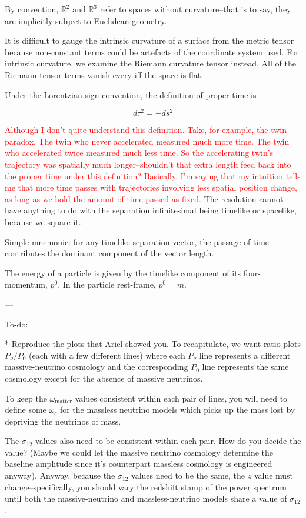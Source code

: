\documentclass[11pt]{article}
\begin{document}
By convention, $\mathbb{R}^2$ and $\mathbb{R}^3$ refer to spaces without curvature--that is to say, they are implicitly subject to Euclidean geometry.

It is difficult to gauge the intrinsic curvature of a surface from the metric tensor because non-constant terms could be artefacts of the coordinate system used. For intrinsic curvature, we examine the Riemann curvature tensor instead. All of the Riemann tensor terms vanish every iff the space is flat.

Under the Lorentzian sign convention, the definition of proper time is

\begin{equation}
	d\tau^2 = -ds^2
\end{equation}

\textcolor{red}{Although I don't quite understand this definition. Take, for example, the twin paradox. The twin who never accelerated measured much more time. The twin who accelerated twice measured much less time. So the accelerating twin's trajectory was spatially much longer--shouldn't that extra length feed back into the proper time under this definition? Basically, I'm saying that my intuition tells me that more time passes with trajectories involving less spatial position change, as long as we hold the amount of time passed as fixed.} The resolution cannot have anything to do with the separation infinitesimal being timelike or spacelike, because we square it.

Simple mnemonic: for any timelike separation vector, the passage of time contributes the dominant component of the vector length.

The energy of a particle is given by the timelike component of its four-momentum, $p^0$. In the particle rest-frame, $p^0 = m$.

---

To-do:

* Reproduce the plots that Ariel showed you. To recapitulate, we want ratio plots $P_\nu / P_0$ (each with a few different lines) where each $P_\nu$ line represents a different massive-neutrino cosmology and the corresponding $P_0$ line represents the same cosmology except for the absence of massive neutrinos.

To keep the $\omega_\text{matter}$ values consistent within each pair of lines, you will need to define some $\omega_c$ for the massless neutrino models which picks up the mass lost by depriving the neutrinos of mass.

The $\sigma_{12}$ values also need to be consistent within each pair. How do you decide the value? (Maybe we could let the massive neutrino cosmology determine the baseline amplitude since it's counterpart massless cosmology is engineered anyway). Anyway, because the $\sigma_{12}$ values need to be the same, the $z$ value must change--specifically, you should vary the redshift stamp of the power spectrum until both the massive-neutrino and massless-neutrino models share a value of $\sigma_{12}$.
\end{document}

